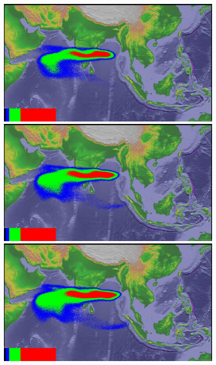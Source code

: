 \begin{figure}[!htb]
    \centering
    \begin{minipage}{.325\textwidth}
        \centering
        \includegraphics[width=0.99 \textwidth]{Chapter-7/Figures/199106180441-ash-5hr-cut15000}
    \end{minipage}%
    \begin{minipage}{.325 \textwidth}
        \centering
        \includegraphics[width=0.99 \textwidth]{Chapter-7/Figures/199106180441-ash-9hr-cut15000}
    \end{minipage}%
    \begin{minipage}{.325 \textwidth}
        \centering
        \includegraphics[width=0.99 \textwidth]{Chapter-7/Figures/199106180441-ash-11hr-cut15000}

\end{minipage}
\end{figure}
